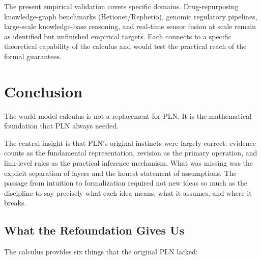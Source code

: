 \documentclass[11pt,openany]{report}
\begin{document}
The present empirical validation covers specific domains.
Drug-repurposing knowledge-graph benchmarks (Hetionet/Rephetio),
genomic regulatory pipelines, large-scale knowledge-base reasoning,
and real-time sensor fusion at scale remain as identified but
unfinished empirical targets.  Each connects to a specific
theoretical capability of the calculus and would test the practical
reach of the formal guarantees.



\chapter{Conclusion}
\label{ch:conclusion}

The world-model calculus is not a replacement for PLN\@.  It is the
mathematical foundation that PLN always needed.

The central insight is that PLN's original instincts were largely
correct: evidence counts as the fundamental representation, revision
as the primary operation, and link-level rules as the practical
inference mechanism.  What was missing was the explicit separation of
layers and the honest statement of assumptions.  The passage from
intuition to formalization required not new ideas so much as the
discipline to say precisely what each idea means, what it assumes, and
where it breaks.

\section{What the Refoundation Gives Us}

The calculus provides six things that the original PLN lacked:
\end{document}
